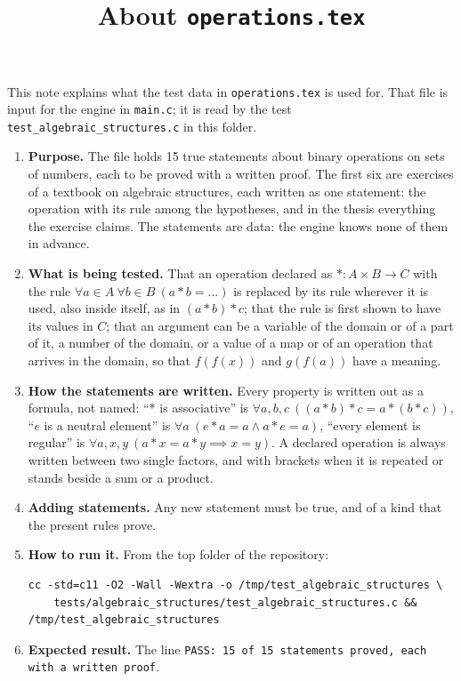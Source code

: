 \documentclass[11pt,a4paper]{article}
\title{About \texttt{operations.tex}}
\author{}
\date{}
\begin{document}
\maketitle
This note explains what the test data in \texttt{operations.tex} is used for. That file is input for the engine in \texttt{main.c}; it is read by the test \texttt{test\_algebraic\_structures.c} in this folder.

\begin{enumerate}
\item \textbf{Purpose.} The file holds 15 true statements about binary operations on sets of numbers, each to be proved with a written proof. The first six are exercises of a textbook on algebraic structures, each written as one statement: the operation with its rule among the hypotheses, and in the thesis everything the exercise claims. The statements are data: the engine knows none of them in advance.

\item \textbf{What is being tested.} That an operation declared as $\ast \colon A \times B \to C$ with the rule $\forall a \in A\ \forall b \in B\ (a \ast b = \ldots)$ is replaced by its rule wherever it is used, also inside itself, as in $(a \ast b) \ast c$; that the rule is first shown to have its values in $C$; that an argument can be a variable of the domain or of a part of it, a number of the domain, or a value of a map or of an operation that arrives in the domain, so that $f(f(x))$ and $g(f(a))$ have a meaning.

\item \textbf{How the statements are written.} Every property is written out as a formula, not named: ``$\ast$ is associative'' is $\forall a, b, c\ ((a \ast b) \ast c = a \ast (b \ast c))$, ``$e$ is a neutral element'' is $\forall a\ (e \ast a = a \land a \ast e = a)$, ``every element is regular'' is $\forall a, x, y\ (a \ast x = a \ast y \implies x = y)$. A declared operation is always written between two single factors, and with brackets when it is repeated or stands beside a sum or a product.

\item \textbf{Adding statements.} Any new statement must be true, and of a kind that the present rules prove.

\item \textbf{How to run it.} From the top folder of the repository:
\begin{verbatim}
cc -std=c11 -O2 -Wall -Wextra -o /tmp/test_algebraic_structures \
    tests/algebraic_structures/test_algebraic_structures.c && /tmp/test_algebraic_structures
\end{verbatim}

\item \textbf{Expected result.} The line \texttt{PASS: 15 of 15 statements proved, each with a written proof}.
\end{enumerate}
\end{document}
